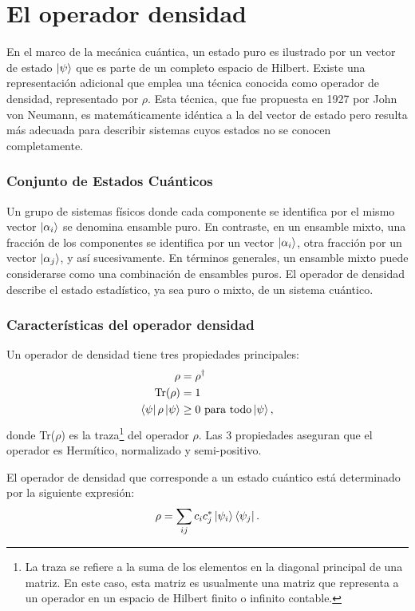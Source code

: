 \documentclass[../main.tex]{subfiles}
\begin{document}
\section{El operador densidad}
En el marco de la mecánica cuántica, un estado puro es ilustrado por un vector de estado $\ket{\psi}$ que es parte de un completo espacio de Hilbert. Existe una representación adicional que emplea una técnica conocida como operador de densidad, representado por $\rho$. Esta técnica, que fue propuesta en 1927 por John von Neumann, es matemáticamente idéntica a la del vector de estado pero resulta más adecuada para describir sistemas cuyos estados no se conocen completamente.

\subsubsection{Conjunto de Estados Cuánticos}
Un grupo de sistemas físicos donde cada componente se identifica por el mismo vector $\ket{\alpha_i}$ se denomina ensamble puro. En contraste, en un ensamble mixto, una fracción de los componentes se identifica por un vector $\ket{\alpha_i}$, otra fracción por un vector $\ket{\alpha_j}$, y así sucesivamente. En términos generales, un ensamble mixto puede considerarse como una combinación de ensambles puros. El operador de densidad describe el estado estadístico, ya sea puro o mixto, de un sistema cuántico.

\subsubsection{Características del operador densidad}
Un operador de densidad tiene tres propiedades principales:
\begin{subequations}
	\begin{align}
		\rho &= \rho^{\dagger}\\
		\text{Tr}(\rho) &=1\\
		\bra{\psi} \rho \ket{\psi} &\geq 0 \, \, \text{para todo} \ket{\psi},
	\end{align}
\end{subequations}
donde Tr($\rho$) es la traza\footnote{La traza se refiere a la suma de los elementos en la diagonal principal de una matriz. En este caso, esta matriz es usualmente una matriz que representa a un operador en un espacio de Hilbert finito o infinito contable.} del operador $\rho$. Las 3 propiedades aseguran que el operador es Hermítico, normalizado y semi-positivo.

El operador de densidad que corresponde a un estado cuántico está determinado por la siguiente expresión:
\begin{align}\label{eq:statePure}
	\rho = \sum_{ij} c_i c_j^* \ket{\psi_i} \bra{\psi_j}.
\end{align}
\end{document}
